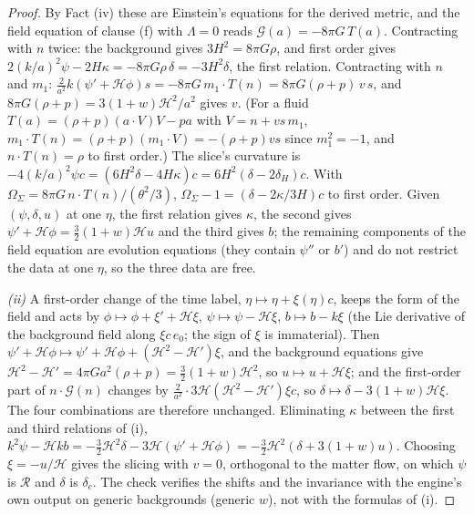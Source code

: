 \begin{proof}
By Fact (iv) these are Einstein's equations for the derived metric, and the field equation of clause (f) with $\Lambda = 0$ reads $\mathcal{G}(a) = -8\pi G\,T(a)$. Contracting with $n$ twice: the background gives $3H^{2} = 8\pi G\rho$, and first order gives $2(k/a)^{2}\psi - 2H\kappa = -8\pi G\rho\,\delta = -3H^{2}\delta$, the first relation. Contracting with $n$ and $m_{1}$: $\tfrac{2}{a^{2}}k(\psi' + \mathcal{H}\phi)s = -8\pi G\,m_{1}\cdot T(n) = 8\pi G(\rho + p)\,v\,s$, and $8\pi G(\rho + p) = 3(1 + w)\mathcal{H}^{2}/a^{2}$ gives $v$. (For a fluid $T(a) = (\rho + p)(a\cdot V)V - pa$ with $V = n + vs\,m_{1}$, $m_{1}\cdot T(n) = (\rho + p)(m_{1}\cdot V) = -(\rho + p)vs$ since $m_{1}^{2} = -1$, and $n\cdot T(n) = \rho$ to first order.) The slice's curvature is $-4(k/a)^{2}\psi c = (6H^{2}\delta - 4H\kappa)c = 6H^{2}(\delta - 2\delta_{H})c$. With $\Omega_{\Sigma} = 8\pi G\,n\cdot T(n)/(\theta^{2}/3)$, $\Omega_{\Sigma} - 1 = (\delta - 2\kappa/3H)c$ to first order. Given $(\psi, \delta, u)$ at one $\eta$, the first relation gives $\kappa$, the second gives $\psi' + \mathcal{H}\phi = \tfrac32(1 + w)\mathcal{H}u$ and the third gives $b$; the remaining components of the field equation are evolution equations (they contain $\psi''$ or $b'$) and do not restrict the data at one $\eta$, so the three data are free.

\emph{(ii)} A first-order change of the time label, $\eta \mapsto \eta + \xi(\eta)c$, keeps the form of the field and acts by $\phi \mapsto \phi + \xi' + \mathcal{H}\xi$, $\psi \mapsto \psi - \mathcal{H}\xi$, $b \mapsto b - k\xi$ (the Lie derivative of the background field along $\xi c\,e_{0}$; the sign of $\xi$ is immaterial). Then $\psi' + \mathcal{H}\phi \mapsto \psi' + \mathcal{H}\phi + (\mathcal{H}^{2} - \mathcal{H}')\xi$, and the background equations give $\mathcal{H}^{2} - \mathcal{H}' = 4\pi Ga^{2}(\rho + p) = \tfrac32(1 + w)\mathcal{H}^{2}$, so $u \mapsto u + \mathcal{H}\xi$; and the first-order part of $n\cdot\mathcal{G}(n)$ changes by $\tfrac{2}{a^{2}}\cdot 3\mathcal{H}(\mathcal{H}^{2} - \mathcal{H}')\xi c$, so $\delta \mapsto \delta - 3(1 + w)\mathcal{H}\xi$. The four combinations are therefore unchanged. Eliminating $\kappa$ between the first and third relations of (i), $k^{2}\psi - \mathcal{H}kb = -\tfrac32\mathcal{H}^{2}\delta - 3\mathcal{H}(\psi' + \mathcal{H}\phi) = -\tfrac32\mathcal{H}^{2}(\delta + 3(1 + w)u)$. Choosing $\xi = -u/\mathcal{H}$ gives the slicing with $v = 0$, orthogonal to the matter flow, on which $\psi$ is $\mathcal{R}$ and $\delta$ is $\delta_{c}$. The check verifies the shifts and the invariance with the engine's own output on generic backgrounds (generic $w$), not with the formulas of (i).


\end{proof}
